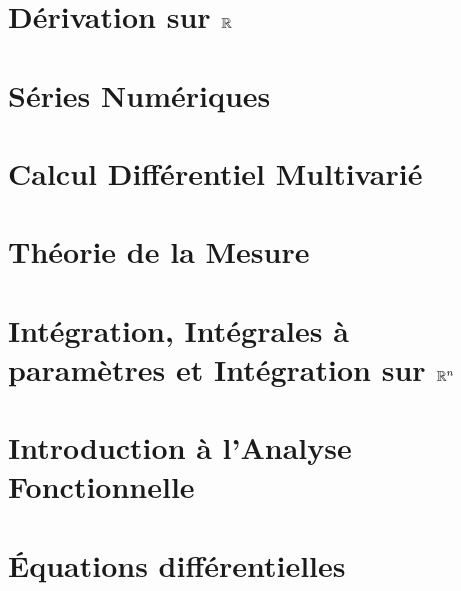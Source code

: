 


\chapter{Dérivation sur $\mathbb{R}$}


\chapter{Séries Numériques}


\chapter{Calcul Différentiel Multivarié}


\chapter{Théorie de la Mesure}


\chapter{Intégration, Intégrales à paramètres et Intégration sur $\mathbb{R}^n$}


\chapter{Introduction à l'Analyse Fonctionnelle}


\chapter{Équations différentielles}





